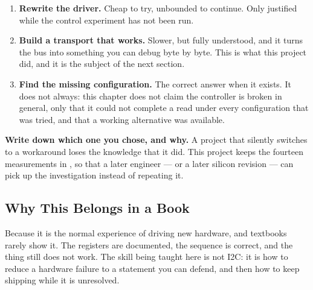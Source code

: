 \begin{enumerate}
    \item \textbf{Rewrite the driver.} Cheap to try, unbounded to continue. Only justified
          while the control experiment has not been run.
    \item \textbf{Build a transport that works.} Slower, but fully understood, and it turns
          the bus into something you can debug byte by byte. This is what this project did,
          and it is the subject of the next section.
    \item \textbf{Find the missing configuration.} The correct answer when it exists. It does
          not always: this chapter does not claim the controller is broken in general, only
          that it could not complete a read under every configuration that was tried, and
          that a working alternative was available.
\end{enumerate}

\begin{warningbox}
    \textbf{Write down which one you chose, and why.} A project that silently switches to a
    workaround loses the knowledge that it did. This project keeps the fourteen measurements
    in , so that a later engineer — or a
    later silicon revision — can pick up the investigation instead of repeating it.
\end{warningbox}

\subsection{Why This Belongs in a Book}

Because it is the normal experience of driving new hardware, and textbooks rarely show it.
The registers are documented, the sequence is correct, and the thing still does not work.
The skill being taught here is not I2C: it is how to reduce a hardware failure to a
statement you can defend, and then how to keep shipping while it is unresolved.
